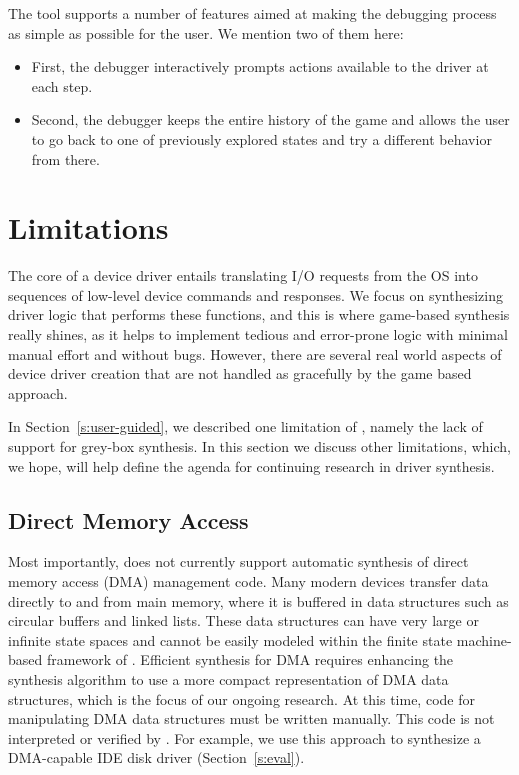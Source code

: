 The tool supports a number of features aimed at making the debugging process as simple as possible for the user. We mention two of them here: 
\begin{itemize}
    \item First, the debugger interactively prompts actions available to the driver at each step.  
    \item Second, the debugger keeps the entire history of the game and allows the user to go back to one of previously explored states and try a different behavior from there.
\end{itemize}

\section{Limitations}\label{s:limitations}

The core of a device driver entails translating I/O requests from the OS into sequences of low-level device commands and responses. We focus on synthesizing driver logic that performs these functions, and this is where game-based synthesis really shines, as it helps to implement tedious and error-prone logic with minimal manual effort and without bugs. However, there are several real world aspects of device driver creation that are not handled as gracefully by the game based approach.

In Section~\ref{s:user-guided}, we described one limitation of \termite, namely the lack of support for grey-box synthesis.  In this section we discuss other limitations, which, we hope, will help define the agenda for continuing research in driver synthesis.

\subsection{Direct Memory Access}

Most importantly, \termite does not currently support automatic synthesis of direct memory access (DMA) management code.  Many modern devices transfer data directly to and from main memory, where it is buffered in data structures such as circular buffers and linked lists.  These data structures can have very large or infinite state spaces and cannot be easily modeled within the finite state machine-based framework of \termite.  Efficient synthesis for DMA requires enhancing the synthesis algorithm to use a more compact representation of DMA data structures, which is the focus of our ongoing research.  At this time, code for manipulating DMA data structures must be written manually.  This code is not interpreted or verified by \termite.  For example, we use this approach to synthesize a DMA-capable IDE disk driver (Section~\ref{s:eval}).

